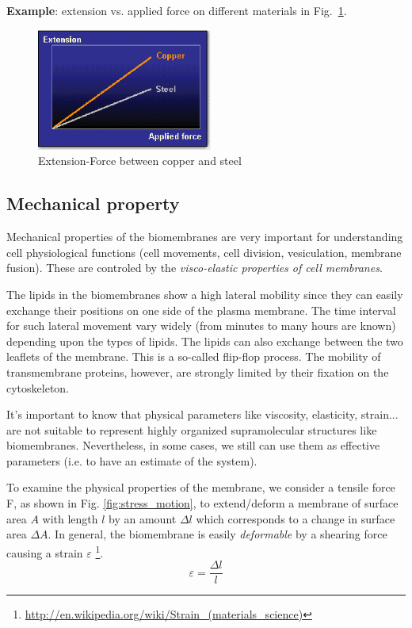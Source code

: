 {\bf Example}: extension vs. applied force on different materials in
Fig.~\ref{fig:extension-force}.
  \begin{figure}[htb]
    \centerline{\includegraphics[height=4cm]{./images/extension-force.eps}}
    \caption{Extension-Force between copper and steel}\label{fig:extension-force}
  \end{figure}


\subsection{Mechanical property}
\label{sec:mechanical-property}


Mechanical properties of the biomembranes are very important for
understanding cell physiological functions (cell movements, cell
division, vesiculation, membrane fusion). These are controled by the
{\it visco-elastic properties of cell membranes}.

The lipids in the biomembranes show a high lateral mobility since they
can easily exchange their positions on one side of the plasma
membrane. The time interval for such lateral movement vary widely
(from minutes to many hours are known) depending upon the types of
lipids. The lipids can also exchange between the two leaflets of the
membrane. This is a so-called flip-flop process. The mobility of
transmembrane proteins, however, are strongly limited by their fixation
on the cytoskeleton.

It's important to know that physical parameters like viscosity,
elasticity, strain... are not suitable to represent highly organized
supramolecular structures like biomembranes.  Nevertheless, in some
cases, we still can use them as effective parameters (i.e. to have an
estimate of the system).

To examine the physical properties of the membrane, we consider a
tensile force F, as shown in Fig. \ref{fig:stress_motion}, to
extend/deform a membrane of surface area $A$ with length $l$ by an
amount $\Delta l$ which corresponds to a change in surface area
$\Delta A$.  In general, the biomembrane is easily {\it deformable} by
a shearing force causing a strain $\varepsilon$
\footnote{\url{http://en.wikipedia.org/wiki/Strain_(materials_science)}}.
\begin{equation}
  \label{eq:25}
  \varepsilon = \frac{\Delta l}{l}
\end{equation}

